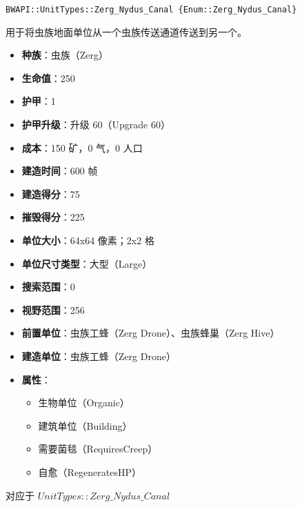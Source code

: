 \begin{tcolorbox}[colback=white, colframe=black!60!white, title=Zerg\_Nydus\_Canal(), arc=0mm]
    \begin{verbatim}
BWAPI::UnitTypes::Zerg_Nydus_Canal {Enum::Zerg_Nydus_Canal}
    \end{verbatim}
    用于将虫族地面单位从一个虫族传送通道传送到另一个。
    \begin{itemize}
        \item \textbf{种族}：虫族（Zerg）
        \item \textbf{生命值}：250
        \item \textbf{护甲}：1
        \item \textbf{护甲升级}：升级 60（Upgrade 60）
        \item \textbf{成本}：150 矿，0 气，0 人口
        \item \textbf{建造时间}：600 帧
        \item \textbf{建造得分}：75
        \item \textbf{摧毁得分}：225
        \item \textbf{单位大小}：64x64 像素；2x2 格
        \item \textbf{单位尺寸类型}：大型（Large）
        \item \textbf{搜索范围}：0
        \item \textbf{视野范围}：256
        \item \textbf{前置单位}：虫族工蜂（Zerg Drone）、虫族蜂巢（Zerg Hive）
        \item \textbf{建造单位}：虫族工蜂（Zerg Drone）
        \item \textbf{属性}：
            \begin{itemize}
                \item 生物单位（Organic）
                \item 建筑单位（Building）
                \item 需要菌毯（RequiresCreep）
                \item 自愈（RegeneratesHP）
            \end{itemize}
    \end{itemize}
    对应于  $UnitTypes::Zerg\_Nydus\_Canal$ 
\end{tcolorbox}

